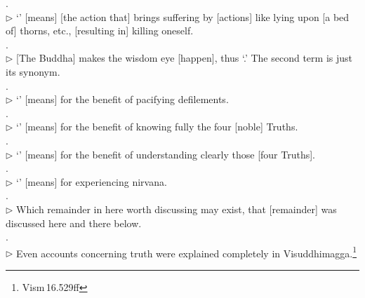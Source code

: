. \\
$\triangleright$ `' [means] [the action that] brings suffering by [actions] like lying upon [a bed of] thorns, etc., [resulting in] killing oneself.\\

\label{sen:cakkhu2}
. \\
$\triangleright$ [The Buddha] makes the wisdom eye [happen], thus `.' The second term is just its synonym.\\

. \\
$\triangleright$ `' [means] for the benefit of pacifying defilements.\\

. \\
$\triangleright$ `' [means] for the benefit of knowing fully the four [noble] Truths.\\

. \\
$\triangleright$ `' [means] for the benefit of understanding clearly those [four Truths].\\

. \\
$\triangleright$ `' [means] for experiencing nirvana.\\

. \\
$\triangleright$ Which remainder in here worth discussing may exist, that [remainder] was discussed here and there below.\\

. \\
$\triangleright$ Even accounts concerning truth were explained completely in Visuddhimagga.\footnote{Vism\,16.529ff}\\

